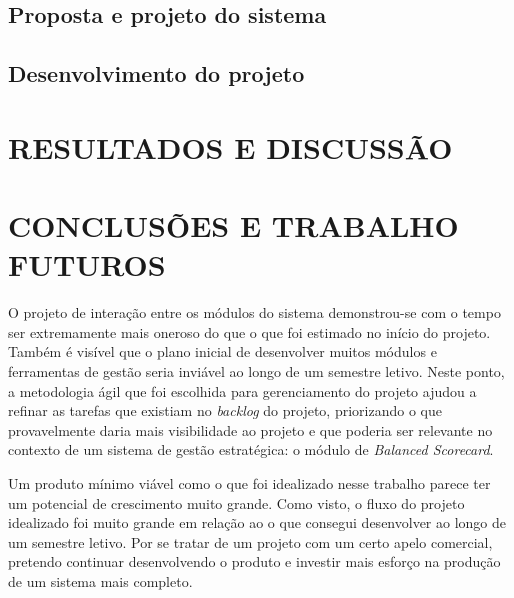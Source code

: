 \documentclass{abnt}
\begin{document}
\section{Proposta e projeto do sistema}


\section{Desenvolvimento do projeto}


\chapter{RESULTADOS E DISCUSSÃO}


\chapter{CONCLUSÕES E TRABALHO FUTUROS}

O projeto de interação entre os módulos do sistema demonstrou-se com o tempo ser
extremamente mais oneroso do que o que foi estimado no início do projeto. Também
é visível que o plano inicial de desenvolver muitos módulos e ferramentas de
gestão seria inviável ao longo de um semestre letivo. Neste ponto, a metodologia
ágil que foi escolhida para gerenciamento do projeto ajudou a refinar as tarefas
que existiam no \textit{backlog} do projeto, priorizando o que provavelmente
daria mais visibilidade ao projeto e que poderia ser relevante no contexto de um
sistema de gestão estratégica: o módulo de \textit{Balanced Scorecard}.


Um produto mínimo viável como o que foi idealizado nesse trabalho parece ter um
potencial de crescimento muito grande. Como visto, o fluxo do projeto idealizado
foi muito grande em relação ao o que consegui desenvolver ao longo de um
semestre letivo. Por se tratar de um projeto com um certo apelo comercial,
pretendo continuar desenvolvendo o produto e investir mais esforço na produção
de um sistema mais completo.



\end{document}
